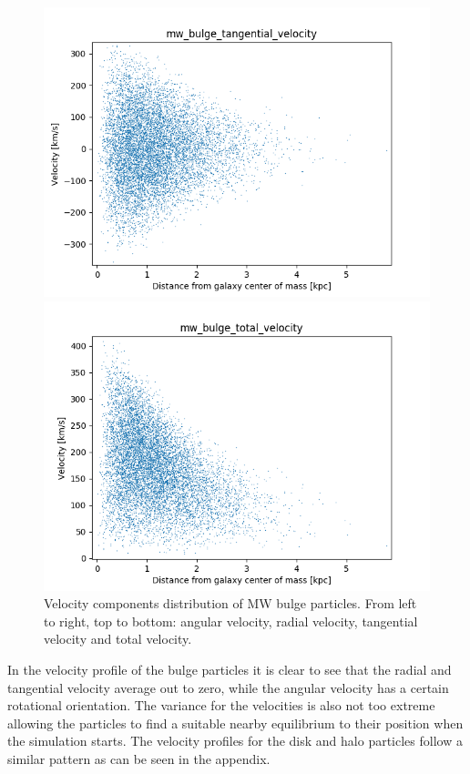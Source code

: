 \documentclass[a4paper,12pt, english]{article}
\begin{document}
\begin{figure}[!h]
\begin{minipage}{0.4\textwidth}
\includegraphics[width=1\textwidth]{VelocityDistr/mw_bulge_tangential_velocity.png}
\end{minipage}
\begin{minipage}{0.4\textwidth}
  \centering
\includegraphics[width=1\textwidth]{VelocityDistr/mw_bulge_total_velocity.png}
\end{minipage}
\caption{Velocity components distribution of MW bulge particles. From left to right, top to bottom: angular velocity, radial velocity, tangential velocity and total velocity.}
\label{fig:mw-vel-distribution}
\end{figure}\par
\smallskip
In the velocity profile of the bulge particles it is clear to see that the radial and tangential velocity average out to zero, while the angular velocity has a certain rotational orientation. The variance for the velocities is also not too extreme allowing the particles to find a suitable nearby equilibrium to their position when the simulation starts. The velocity profiles for the disk and halo particles follow a similar pattern as can be seen in the appendix.\par
\end{document}
